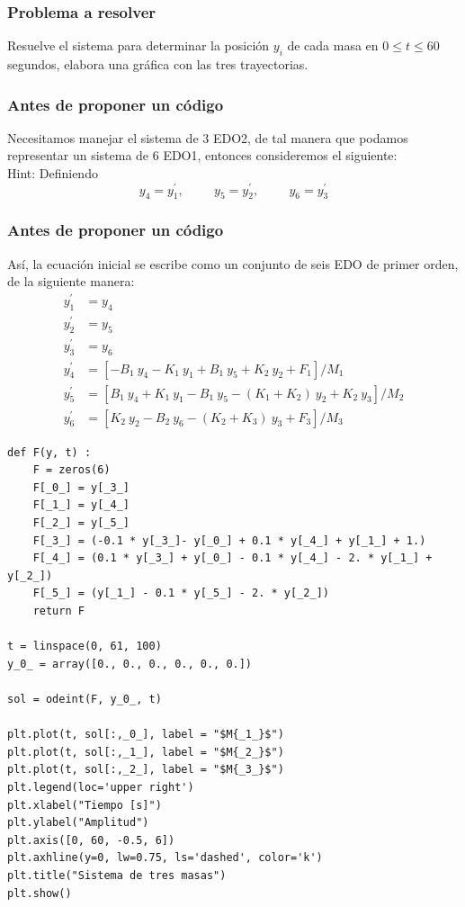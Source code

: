 \begin{frame}
\frametitle{Problema a resolver}
Resuelve el sistema para determinar la posición $y_{i}$ de cada masa en $0 \leq t \leq 60$ segundos, elabora una gráfica con las tres trayectorias.
\end{frame}
\begin{frame}
\frametitle{Antes de proponer un código}
Necesitamos manejar el sistema de 3 EDO2, de tal manera que podamos representar un sistema de 6 EDO1, entonces consideremos el siguiente:
\\
\bigskip
Hint: Definiendo
\[ y_{4} = y^{\prime}_{1}, \hspace{1cm} y_{5} = y^{\prime}_{2}, \hspace{1cm} y_{6} = y^{\prime}_{3} \]
\end{frame}
\begin{frame}
\frametitle{Antes de proponer un código}
Así, la ecuación inicial se escribe como un conjunto de seis EDO de primer orden, de la siguiente manera:
\fontsize{12}{12}\selectfont
\begin{align*}
y^{\prime}_{1} & = y_{4} \\
y^{\prime}_{2} & = y_{5} \\
y^{\prime}_{3} & = y_{6} \\
y^{\prime}_{4} & = \left[ -B_{1} \: y_{4} - K_{1} \: y_{1} + B_{1} \: y_{5} + K_{2} \: y_{2} + F_{1} \right] / M_{1} \\
y^{\prime}_{5} & = \left[ B_{1} \: y_{4} + K_{1} \: y_{1} - B_{1} \: y_{5} - \left( K_{1} + K_{2} \right) \: y_{2} + K_{2} \: y_{3} \right] / M_{2}\\
y^{\prime}_{6} & = \left[ K_{2} \: y_{2} - B_{2} \: y_{6} - \left( K_{2} + K_{3} \right) \: y_{3} + F_{3} \right] / M_{3}
\end{align*}
\end{frame}
\begin{frame}
\begin{lstlisting}[caption=Código para el sistema de masas, style=FormattedNumber, basicstyle=\linespread{1.1}\ttfamily=\small, columns=fullflexible]
def F(y, t) : 
    F = zeros(6)
    F[_0_] = y[_3_]
    F[_1_] = y[_4_]
    F[_2_] = y[_5_]
    F[_3_] = (-0.1 * y[_3_]- y[_0_] + 0.1 * y[_4_] + y[_1_] + 1.)
    F[_4_] = (0.1 * y[_3_] + y[_0_] - 0.1 * y[_4_] - 2. * y[_1_] + y[_2_])
    F[_5_] = (y[_1_] - 0.1 * y[_5_] - 2. * y[_2_])
    return F

t = linspace(0, 61, 100)
y_0_ = array([0., 0., 0., 0., 0., 0.])

sol = odeint(F, y_0_, t)

plt.plot(t, sol[:,_0_], label = "$M{_1_}$")
plt.plot(t, sol[:,_1_], label = "$M{_2_}$")
plt.plot(t, sol[:,_2_], label = "$M{_3_}$")
plt.legend(loc='upper right')
plt.xlabel("Tiempo [s]")
plt.ylabel("Amplitud")
plt.axis([0, 60, -0.5, 6])
plt.axhline(y=0, lw=0.75, ls='dashed', color='k')
plt.title("Sistema de tres masas")
plt.show()
\end{lstlisting}
\end{frame}
